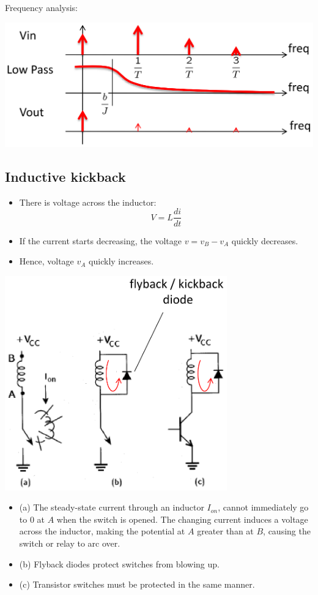 \documentclass[11pt]{article}
\begin{document}
Frequency analysis:
\begin{center}
\includegraphics[width=.9\linewidth]{./images/pulse-width-modulation-frequency-analysis-graph.png}
\end{center}

 \newpage
\subsection{Inductive kickback}
\label{sec:orgd01cfa2}
\begin{itemize}
\item There is voltage across the inductor:
\[V = L \frac{di}{dt}\]
\item If the current starts decreasing, the voltage \(v = v_B - v_A\) quickly decreases.
\item Hence, voltage \(v_A\) quickly increases.
\end{itemize}

\begin{center}
\includegraphics[height=25em]{./images/inductive-kickback-diagram.png}
\end{center}

\begin{itemize}
\item (a) The steady-state current through an inductor \(I_{on}\), cannot immediately go to 0 at \(A\) when the switch is opened. The changing current induces a voltage across the inductor, making the potential at \(A\) greater than at \(B\), causing the switch or relay to arc over.
\item (b) Flyback diodes protect switches from blowing up.
\item (c) Transistor switches must be protected in the same manner.
\end{itemize}
\end{document}
